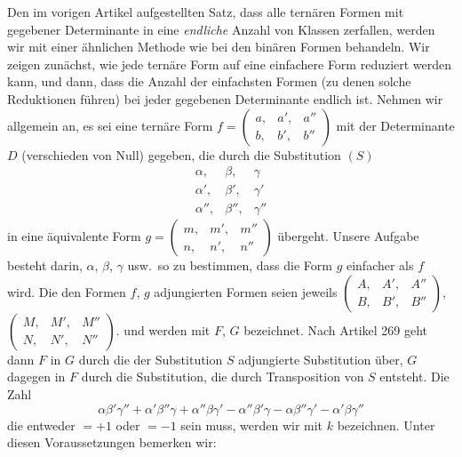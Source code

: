 Den im vorigen Artikel aufgestellten Satz, dass alle ternären Formen mit gegebener Determinante in eine \emph{endliche} Anzahl von Klassen zerfallen, werden wir mit einer ähnlichen Methode wie bei den binären Formen behandeln. Wir zeigen zunächst, wie jede ternäre Form auf eine einfachere Form reduziert werden kann, und dann, dass die Anzahl der einfachsten Formen (zu denen solche Reduktionen führen) bei jeder gegebenen Determinante endlich ist. Nehmen wir allgemein an, es sei eine ternäre Form \(f=\left(\begin{smallmatrix}a,&a',&a''\\b,&b',&b''\end{smallmatrix}\right)\) mit der Determinante \(D\) (verschieden von Null) gegeben, die durch die Substitution \((S)\)
\[
\begin{array}{ccc}
\alpha,&\beta,&\gamma\\
\alpha',&\beta',&\gamma'\\
\alpha'',&\beta'',&\gamma''
\end{array}
\]
in eine äquivalente Form \(g=\left(\begin{smallmatrix}m,&m',&m''\\n,&n',&n''\end{smallmatrix}\right)\) übergeht. Unsere Aufgabe besteht darin, \(\alpha\), \(\beta\), \(\gamma\) usw.\ so zu bestimmen, dass die Form \(g\) einfacher als \(f\) wird. Die den Formen \(f\), \(g\) adjungierten Formen seien jeweils \(\left(\begin{smallmatrix}A,&A',&A''\\B,&B',&B''\end{smallmatrix}\right)\), \(\left(\begin{smallmatrix}M,&M',&M''\\N,&N',&N''\end{smallmatrix}\right)\). und werden mit \(F\), \(G\) bezeichnet. Nach Artikel 269 geht dann \(F\) in \(G\) durch die der Substitution \(S\) adjungierte Substitution über, \(G\) dagegen in \(F\) durch die Substitution, die durch Transposition von \(S\) entsteht. Die Zahl
\[
\alpha\beta'\gamma''+\alpha'\beta''\gamma+\alpha''\beta\gamma'-\alpha''\beta'\gamma-\alpha\beta''\gamma'-\alpha'\beta\gamma''
\]
die entweder \(=+1\) oder \(=-1\) sein muss, werden wir mit \(k\) bezeichnen. Unter diesen Voraussetzungen bemerken wir:

